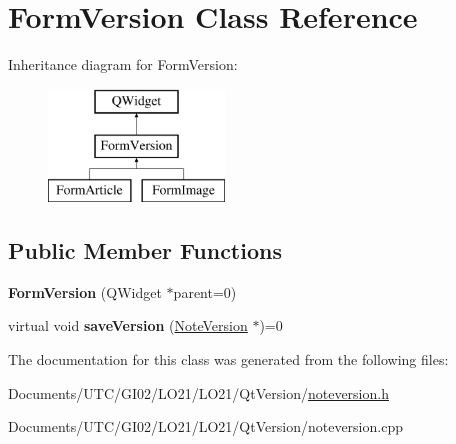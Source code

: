 \hypertarget{class_form_version}{}\section{Form\+Version Class Reference}
\label{class_form_version}
Inheritance diagram for Form\+Version\+:\begin{figure}[H]
\begin{center}
\leavevmode
\includegraphics[height=3.000000cm]{class_form_version}
\end{center}
\end{figure}
\subsection*{Public Member Functions}
\begin{DoxyCompactItemize}
\item 
\mbox{\label{class_form_version_a8a9de9f27b5558bd1a5b89a076194bea}} 
{\bfseries Form\+Version} (Q\+Widget $\ast$parent=0)
\item 
\mbox{\label{class_form_version_a11ab533de81b0930aa8c5e7e53328629}} 
virtual void {\bfseries save\+Version} (\hyperlink{class_note_version}{Note\+Version} $\ast$)=0
\end{DoxyCompactItemize}


The documentation for this class was generated from the following files\+:\begin{DoxyCompactItemize}
\item 
Documents/\+U\+T\+C/\+G\+I02/\+L\+O21/\+L\+O21/\+Qt\+Version/\hyperlink{noteversion_8h}{noteversion.\+h}\item 
Documents/\+U\+T\+C/\+G\+I02/\+L\+O21/\+L\+O21/\+Qt\+Version/noteversion.\+cpp\end{DoxyCompactItemize}
